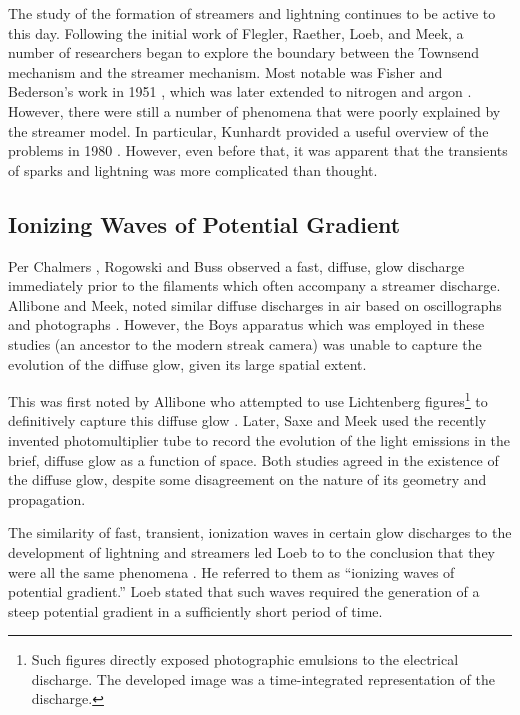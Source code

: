 The study of the formation of streamers and lightning continues to be active to
this day. Following the initial work of Flegler, Raether, Loeb, and Meek, a
number of researchers began to explore the boundary between the Townsend
mechanism and the streamer mechanism. Most notable was Fisher and Bederson's
work in 1951 \cite{Fisher1951}, which was later extended to nitrogen
\cite{Kachickas1952} and argon \cite{Kachickas1953}. However, there were still a
number of phenomena that were poorly explained by the streamer model. In
particular, Kunhardt provided a useful overview of the problems in 1980
\cite{Kunhardt1980}. However, even before that, it was apparent that the
transients of sparks and lightning was more complicated than thought.

\subsection{Ionizing Waves of Potential Gradient}

Per Chalmers \cite{Chalmers1971}, Rogowski and Buss \cite{Rogowski1927,
Buss1932} observed a fast, diffuse, glow discharge immediately prior to the
filaments which often accompany a streamer discharge. Allibone and Meek, noted
similar diffuse discharges in air based on oscillographs and photographs
\cite{Allibone1938, Allibone1938b, Allibone1938c}. However, the Boys apparatus
which was employed in these studies (an ancestor to the modern streak camera)
was unable to capture the evolution of the diffuse glow, given its large spatial
extent.

This was first noted by Allibone who attempted to use Lichtenberg
figures\footnote{Such figures directly exposed photographic emulsions to the
electrical discharge. The developed image was a time-integrated representation
of the discharge.} to definitively capture this diffuse glow
\cite{Allibone1948}. Later, Saxe and Meek used the recently invented
photomultiplier tube to record the evolution of the light emissions in the
brief, diffuse glow \cite{Saxe1948} as a function of space. Both studies
agreed in the existence of the diffuse glow, despite some disagreement on the
nature of its geometry and propagation.

The similarity of fast, transient, ionization waves in certain glow discharges
\cite{Westberg1959} to the development of lightning and streamers led Loeb to to
the conclusion that they were all the same phenomena \cite{Loeb1965}. He 
referred to them as ``ionizing waves of potential gradient.'' Loeb stated that
such waves required the generation of a steep potential gradient in a
sufficiently short period of time.

